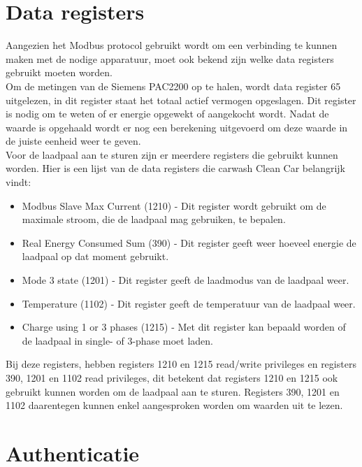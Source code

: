 \section{Data registers}
\label{sec:stand-van-zaken-dataregisters}

Aangezien het Modbus protocol gebruikt wordt om een verbinding te kunnen maken met de nodige apparatuur, moet ook bekend zijn welke data registers gebruikt moeten worden.\\

Om de metingen van de Siemens PAC2200 op te halen, wordt data register 65 uitgelezen, in dit register staat het totaal actief vermogen opgeslagen. Dit register is nodig om te weten of er energie opgewekt of aangekocht wordt. Nadat de waarde is opgehaald wordt er nog een berekening uitgevoerd om deze waarde in de juiste eenheid weer te geven.\\

Voor de laadpaal aan te sturen zijn er meerdere registers die gebruikt kunnen worden. Hier is een lijst van de data registers die carwash Clean Car belangrijk vindt:

\begin{itemize}
    \item Modbus Slave Max Current (1210) - Dit register wordt gebruikt om de maximale stroom, die de laadpaal mag gebruiken, te bepalen.
    \item Real Energy Consumed Sum (390) - Dit register geeft weer hoeveel energie de laadpaal op dat moment gebruikt.
    \item Mode 3 state (1201) - Dit register geeft de laadmodus van de laadpaal weer.
    \item Temperature (1102) - Dit register geeft de temperatuur van de laadpaal weer.
    \item Charge using 1 or 3 phases (1215) - Met dit register kan bepaald worden of de laadpaal in single- of 3-phase moet laden.
\end{itemize}

Bij deze registers, hebben registers 1210 en 1215 read/write privileges en registers 390, 1201 en 1102 read privileges, dit betekent dat registers 1210 en 1215 ook gebruikt kunnen worden om de laadpaal aan te sturen. Registers 390, 1201 en 1102 daarentegen kunnen enkel aangesproken worden om waarden uit te lezen.

\section{Authenticatie}
\label{sec:stand-van-zaken-authenticatie}

